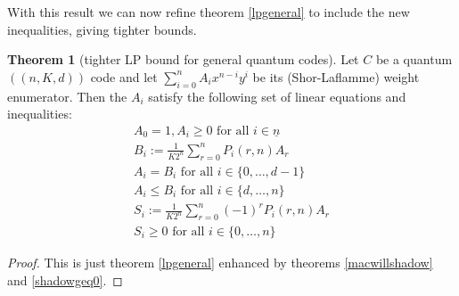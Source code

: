 \documentclass{article}
\def\n{\underline{n}}
\def\fa{\text{ for all }}
\theoremstyle{definition}
\newtheorem{theorem}[Satz]{Theorem}
\begin{document}
With this result we can now refine theorem \ref{lpgeneral} to include the new inequalities, giving tighter bounds.

\begin{theorem}[tighter LP bound for general quantum codes]
Let $C$ be a quantum $((n,K,d))$ code and let $\sum_{i=0}^n A_i x^{n-i} y^{i}$ be its (Shor-Laflamme) weight enumerator. Then the $A_i$ satisfy the following set of linear equations and inequalities:
\begin{align}
A_0 = 1, A_i \geq 0 \fa i \in \n \\
B_i := \frac{1}{K 2^{n}} \sum_{r=0}^n P_i(r,n) A_r \\
A_i = B_i \fa i \in \{0, \ldots, d-1 \} \\
A_i \leq B_i \fa i \in \{d, \ldots, n \} \\
S_i := \frac{1}{K 2^{n}} \sum_{r=0}^n (-1)^r P_i(r,n) A_r \\
S_i \geq 0 \fa i \in \{0, \ldots, n \}
\end{align}
\begin{proof}
This is just theorem \ref{lpgeneral} enhanced by theorems \ref{macwillshadow} and \ref{shadowgeq0}.
\end{proof}
\end{theorem}
\end{document}
